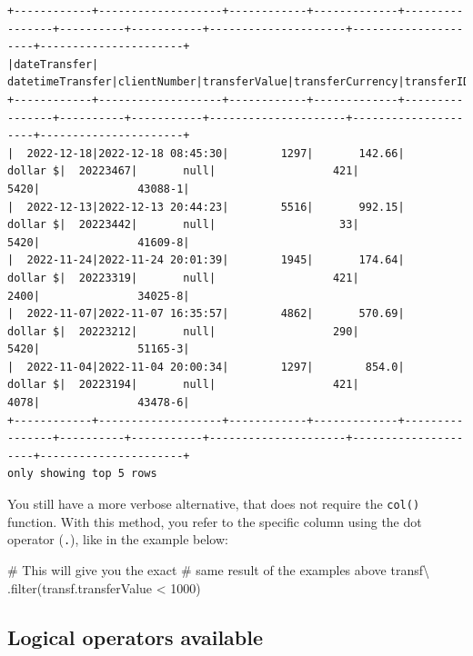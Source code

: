 \documentclass[
  11pt,
  letterpaper,
  DIV=11,
  numbers=noendperiod]{scrreprt}
\newenvironment{Shaded}{\begin{snugshade}}{\end{snugshade}}
\newcommand{\BuiltInTok}[1]{\textcolor[rgb]{0.00,0.23,0.31}{#1}}
\newcommand{\CommentTok}[1]{\textcolor[rgb]{0.37,0.37,0.37}{#1}}
\newcommand{\DecValTok}[1]{\textcolor[rgb]{0.68,0.00,0.00}{#1}}
\newcommand{\NormalTok}[1]{\textcolor[rgb]{0.00,0.23,0.31}{#1}}
\newcommand{\OperatorTok}[1]{\textcolor[rgb]{0.37,0.37,0.37}{#1}}
\begin{document}
\begin{verbatim}
+------------+-------------------+------------+-------------+----------------+----------+-----------+---------------------+---------------------+----------------------+
|dateTransfer|   datetimeTransfer|clientNumber|transferValue|transferCurrency|transferID|transferLog|destinationBankNumber|destinationBankBranch|destinationBankAccount|
+------------+-------------------+------------+-------------+----------------+----------+-----------+---------------------+---------------------+----------------------+
|  2022-12-18|2022-12-18 08:45:30|        1297|       142.66|        dollar $|  20223467|       null|                  421|                 5420|               43088-1|
|  2022-12-13|2022-12-13 20:44:23|        5516|       992.15|        dollar $|  20223442|       null|                   33|                 5420|               41609-8|
|  2022-11-24|2022-11-24 20:01:39|        1945|       174.64|        dollar $|  20223319|       null|                  421|                 2400|               34025-8|
|  2022-11-07|2022-11-07 16:35:57|        4862|       570.69|        dollar $|  20223212|       null|                  290|                 5420|               51165-3|
|  2022-11-04|2022-11-04 20:00:34|        1297|        854.0|        dollar $|  20223194|       null|                  421|                 4078|               43478-6|
+------------+-------------------+------------+-------------+----------------+----------+-----------+---------------------+---------------------+----------------------+
only showing top 5 rows
\end{verbatim}

You still have a more verbose alternative, that does not require the
\texttt{col()} function. With this method, you refer to the specific
column using the dot operator (\texttt{.}), like in the example below:

\begin{Shaded}
\begin{Highlighting}[]
\CommentTok{\# This will give you the exact}
\CommentTok{\# same result of the examples above}
\NormalTok{transf}\OperatorTok{\textbackslash{}}
\NormalTok{  .}\BuiltInTok{filter}\NormalTok{(transf.transferValue }\OperatorTok{\textless{}} \DecValTok{1000}\NormalTok{)}
\end{Highlighting}
\end{Shaded}

\hypertarget{logical-operators-available}{%
\subsection{Logical operators
available}\label{logical-operators-available}}
\end{document}

